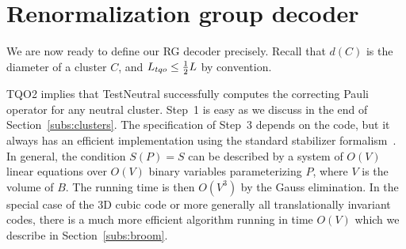 \section{Renormalization group decoder}
\label{subs:rgdecoder}

We are now ready to define our RG decoder precisely.
Recall that $d(C)$ is the diameter of a cluster $C$, and ${L_{tqo}} \le \frac{1}{2} L$ by convention.
\begin{center}
\end{center}
TQO2 implies that
TestNeutral successfully computes the correcting Pauli operator for any neutral cluster.
Step~1 is easy as we discuss in the end of Section~\ref{subs:clusters}.
The specification of Step~3 depends on the code,
but it always has an efficient implementation
using the standard stabilizer formalism~\cite{Gottesman1998Theory}.
In general, the condition $S(P)=S$ can be described by
a system of $O(V)$ linear equations over $O(V)$ binary variables parameterizing $P$,
where $V$ is the volume of $B$.
The running time is then $O(V^3)$ by the Gauss elimination.
In the special case of the 3D cubic code or more generally all translationally invariant codes,
there is a much more efficient algorithm running in time $O(V)$
which we describe in Section~\ref{subs:broom}.

